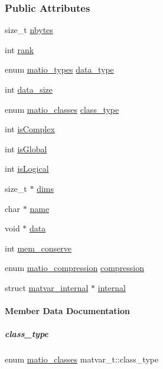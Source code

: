 \subsubsection*{Public Attributes}
\begin{DoxyCompactItemize}
\item 
size\+\_\+t \hyperlink{group___m_a_t_abf1c844540503be2df9bb3db93cfe307}{nbytes}
\item 
int \hyperlink{group___m_a_t_a84ba70c96ded13cc555fa75b768d9921}{rank}
\item 
enum \hyperlink{group___m_a_t_gacf7b3b879282b7ab3a51190e49bf3453}{matio\+\_\+types} \hyperlink{group___m_a_t_ab6aafe9bd77f0f077852593dec438144}{data\+\_\+type}
\item 
int \hyperlink{group___m_a_t_a9ad1c82e2b568da617e12dc73a26e1f9}{data\+\_\+size}
\item 
enum \hyperlink{group___m_a_t_gad4d60ae7b709fc81bfd744fb4c857c40}{matio\+\_\+classes} \hyperlink{group___m_a_t_aff13035bf3265dd7d9425e5d40c839d4}{class\+\_\+type}
\item 
int \hyperlink{group___m_a_t_aeb03b3a69f108dc05470b00443a43739}{is\+Complex}
\item 
int \hyperlink{group___m_a_t_af26c71c4c0ddb14931d15910dddac1bc}{is\+Global}
\item 
int \hyperlink{group___m_a_t_a866c1539e68073a837833d74cd4a65be}{is\+Logical}
\item 
size\+\_\+t $\ast$ \hyperlink{group___m_a_t_a8e01234e1c862ce3472bb37f5a09b92c}{dims}
\item 
char $\ast$ \hyperlink{group___m_a_t_a5d4b55b041e3b4fb50c04337f05ad909}{name}
\item 
void $\ast$ \hyperlink{group___m_a_t_a5672978efa230bbdecdf38ede781f7fa}{data}
\item 
int \hyperlink{group___m_a_t_aff20e87a00691c97340ab07656a13ee7}{mem\+\_\+conserve}
\item 
enum \hyperlink{group___m_a_t_ga768c318af97bd2567758ecb001ceb7f4}{matio\+\_\+compression} \hyperlink{group___m_a_t_aeef0466048621cb2c959ba7f6c774d06}{compression}
\item 
struct \hyperlink{structmatvar__internal}{matvar\+\_\+internal} $\ast$ \hyperlink{group___m_a_t_a6e97e3ed9f40c49322c18561c2a94e92}{internal}
\end{DoxyCompactItemize}


\paragraph{Member Data Documentation}
\mbox{\label{group___m_a_t_aff13035bf3265dd7d9425e5d40c839d4}} 
\subparagraph{\texorpdfstring{class\+\_\+type}{class\_type}}
{\footnotesize\ttfamily enum \hyperlink{group___m_a_t_gad4d60ae7b709fc81bfd744fb4c857c40}{matio\+\_\+classes} matvar\+\_\+t\+::class\+\_\+type}

